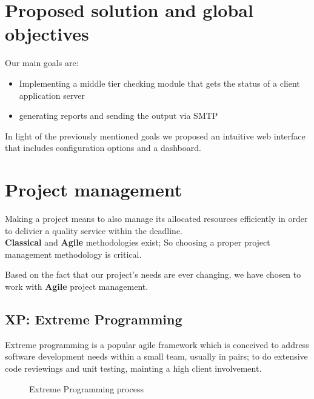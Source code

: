\section{Proposed solution and global objectives}

Our main goals are:
\begin{itemize}
    \item Implementing a middle tier checking module that gets the status of a client application server
    \item generating reports and sending the output via SMTP
\end{itemize}
In light of the previously mentioned goals we proposed an intuitive web interface that includes configuration
options and a dashboard.



\section{Project management}
Making a project means to also manage its allocated resources efficiently in order to delivier a quality 
service within the deadline.\\
\textbf{Classical} and \textbf{Agile} methodologies exist; So choosing a proper project management methodology is critical.

Based on the fact that our project's needs are ever changing, we have chosen to work with \textbf{Agile} project management.
\subsection{XP: Extreme Programming}
Extreme programming is a popular agile framework which is conceived to address software development needs
within a small team, usually in pairs; to do extensive code reviewings and unit testing, mainting a high client involvement. \cite{XPIntro}\\
\begin{figure}[htpb]
\centering
{}
\caption{Extreme Programming process \cite{WikiXP}}
\label{fig:XP_process}
\end{figure}

